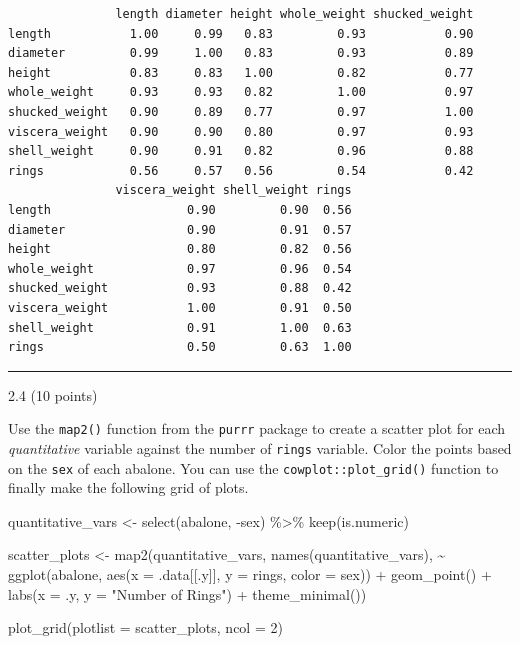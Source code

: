 \documentclass[
  letterpaper,
  DIV=11,
  numbers=noendperiod]{scrartcl}
\newenvironment{Shaded}{\begin{snugshade}}{\end{snugshade}}
\newcommand{\AttributeTok}[1]{\textcolor[rgb]{0.40,0.45,0.13}{#1}}
\newcommand{\DecValTok}[1]{\textcolor[rgb]{0.68,0.00,0.00}{#1}}
\newcommand{\FunctionTok}[1]{\textcolor[rgb]{0.28,0.35,0.67}{#1}}
\newcommand{\NormalTok}[1]{\textcolor[rgb]{0.00,0.23,0.31}{#1}}
\newcommand{\OtherTok}[1]{\textcolor[rgb]{0.00,0.23,0.31}{#1}}
\newcommand{\SpecialCharTok}[1]{\textcolor[rgb]{0.37,0.37,0.37}{#1}}
\newcommand{\StringTok}[1]{\textcolor[rgb]{0.13,0.47,0.30}{#1}}
\begin{document}
\begin{verbatim}
               length diameter height whole_weight shucked_weight
length           1.00     0.99   0.83         0.93           0.90
diameter         0.99     1.00   0.83         0.93           0.89
height           0.83     0.83   1.00         0.82           0.77
whole_weight     0.93     0.93   0.82         1.00           0.97
shucked_weight   0.90     0.89   0.77         0.97           1.00
viscera_weight   0.90     0.90   0.80         0.97           0.93
shell_weight     0.90     0.91   0.82         0.96           0.88
rings            0.56     0.57   0.56         0.54           0.42
               viscera_weight shell_weight rings
length                   0.90         0.90  0.56
diameter                 0.90         0.91  0.57
height                   0.80         0.82  0.56
whole_weight             0.97         0.96  0.54
shucked_weight           0.93         0.88  0.42
viscera_weight           1.00         0.91  0.50
shell_weight             0.91         1.00  0.63
rings                    0.50         0.63  1.00
\end{verbatim}

\begin{center}\rule{0.5\linewidth}{0.5pt}\end{center}

2.4 (10 points)

Use the \texttt{map2()} function from the \texttt{purrr} package to
create a scatter plot for each \emph{quantitative} variable against the
number of \texttt{rings} variable. Color the points based on the
\texttt{sex} of each abalone. You can use the
\texttt{cowplot::plot\_grid()} function to finally make the following
grid of plots.

\begin{Shaded}
\begin{Highlighting}[]
\NormalTok{quantitative\_vars }\OtherTok{\textless{}{-}} \FunctionTok{select}\NormalTok{(abalone, }\SpecialCharTok{{-}}\NormalTok{sex) }\SpecialCharTok{\%\textgreater{}\%}
  \FunctionTok{keep}\NormalTok{(is.numeric)}

\NormalTok{scatter\_plots }\OtherTok{\textless{}{-}} \FunctionTok{map2}\NormalTok{(quantitative\_vars, }\FunctionTok{names}\NormalTok{(quantitative\_vars), }\SpecialCharTok{\textasciitilde{}}
                        \FunctionTok{ggplot}\NormalTok{(abalone, }\FunctionTok{aes}\NormalTok{(}\AttributeTok{x =}\NormalTok{ .data[[.y]], }\AttributeTok{y =}\NormalTok{ rings, }\AttributeTok{color =}\NormalTok{ sex)) }\SpecialCharTok{+}
                          \FunctionTok{geom\_point}\NormalTok{() }\SpecialCharTok{+}
                          \FunctionTok{labs}\NormalTok{(}\AttributeTok{x =}\NormalTok{ .y, }\AttributeTok{y =} \StringTok{"Number of Rings"}\NormalTok{) }\SpecialCharTok{+}
                          \FunctionTok{theme\_minimal}\NormalTok{())}

\FunctionTok{plot\_grid}\NormalTok{(}\AttributeTok{plotlist =}\NormalTok{ scatter\_plots, }\AttributeTok{ncol =} \DecValTok{2}\NormalTok{)}
\end{Highlighting}
\end{Shaded}
\end{document}
